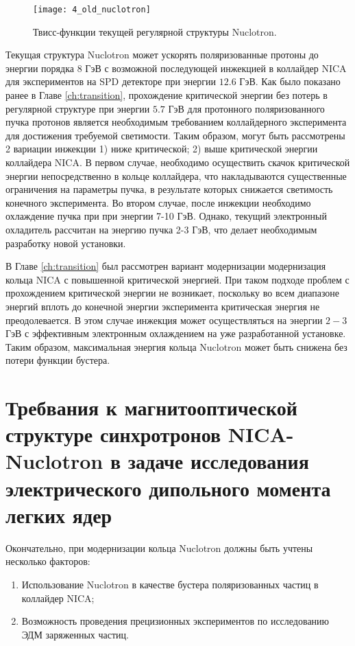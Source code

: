 \begin{figure}[!h]
  \centering
	\texttt{[image: 4\_old\_nuclotron]}
   \caption{Твисс-функции текущей регулярной структуры Nuclotron.}
   \label{fig:4_old_nuclotron}
\end{figure}

\par Текущая структура Nuclotron может ускорять поляризованные протоны до энергии порядка $8$ ГэВ с возможной последующей инжекцией в коллайдер NICA для экспериментов на SPD детекторе при энергии $12.6$ ГэВ. Как было показано ранее в Главе \ref{ch:transition}, прохождение критической энергии без потерь в регулярной структуре при энергии $5.7$ ГэВ для протонного поляризованного пучка протонов является необходимым требованием коллайдерного эксперимента для достижения требуемой светимости. Таким образом, могут быть рассмотрены 2 вариации инжекции 1) ниже критической; 2) выше критической энергии коллайдера NICA. В первом случае, необходимо осуществить скачок критической энергии непосредственно в кольце коллайдера, что накладываются существенные ограничения на параметры пучка, в результате которых снижается светимость конечного эксперимента. Во втором случае, после инжекции необходимо охлаждение пучка при  при энергии 7-10 ГэВ. Однако, текущий электронный охладитель рассчитан на энергию пучка 2-3 ГэВ, что делает необходимым разработку новой установки.

\noindent В Главе \ref{ch:transition} был рассмотрен вариант модернизации модернизация кольца NICA с повышенной критической энергией. При таком подходе проблем с прохождением критической энергии не возникает, поскольку во всем диапазоне энергий вплоть до конечной энергии эксперимента критическая энергия не преодолевается. В этом случае инжекция может осуществляться на энергии $2-3$ ГэВ с эффективным электронным охлаждением на уже разработанной установке. Таким образом, максимальная энергия кольца Nuclotron может быть снижена без потери функции бустера.

	\section{Требвания к магнитооптической структуре синхротронов NICA-Nuclotron в задаче исследования электрического дипольного момента легких ядер}\label{sec:EDM/requirements}

Окончательно, при модернизации кольца Nuclotron должны быть учтены несколько факторов:

\begin{enumerate}
    \item Использование Nuclotron в качестве бустера поляризованных частиц в коллайдер NICA;
    \item Возможность проведения прецизионных экспериментов по исследованию ЭДМ заряженных частиц.
\end{enumerate}

